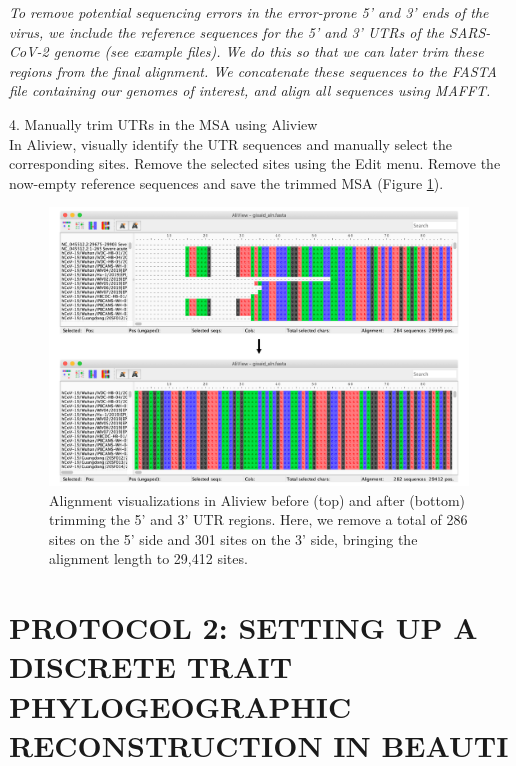 \documentclass{article}
\newcommand{\ann}[1]{
\begin{adjustwidth}{0.5cm}{}
\it{#1}\\
\end{adjustwidth}}
\begin{document}
\ann{To remove potential sequencing errors in the error-prone 5' and 3' ends of the virus, we include the reference sequences for the 5' and 3' UTRs of the SARS-CoV-2 genome (see example files).
We do this so that we can later trim these regions from the final alignment.
We concatenate these sequences to the FASTA file containing our genomes of interest, and align all sequences using MAFFT.}

4. Manually trim UTRs in the MSA using Aliview\\

In Aliview, visually identify the UTR sequences and manually select the corresponding sites. Remove the selected sites using the Edit menu.
Remove the now-empty reference sequences and save the trimmed MSA (Figure \ref{fig:aliview}).\\

\begin{figure}[!ht]
    \centering
    \includegraphics[width=0.99\textwidth]{figs/aliview.pdf}
    \caption{Alignment visualizations in Aliview before (top) and after (bottom) trimming the 5' and 3' UTR regions. Here, we remove a total of 286 sites on the 5' side and 301 sites on the 3' side, bringing the alignment length to 29,412 sites.}
    \label{fig:aliview}
\end{figure}


\section*{PROTOCOL 2: SETTING UP A DISCRETE TRAIT PHYLOGEOGRAPHIC RECONSTRUCTION IN BEAUTI}
\end{document}
